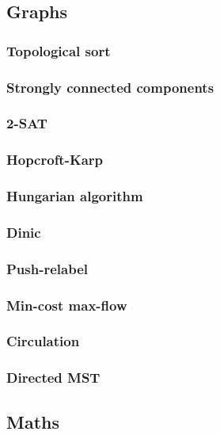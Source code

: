 \documentclass[landscape,a4paper,twocolumn,10pt]{report}
\begin{document}
\footnotesize

\subsection*{Graphs}
\subsubsection*{Topological sort}

\subsubsection*{Strongly connected components}

\subsubsection*{2-SAT}

\subsubsection*{Hopcroft-Karp}

\subsubsection*{Hungarian algorithm}

\subsubsection*{Dinic}

\subsubsection*{Push-relabel}

\subsubsection*{Min-cost max-flow}

\subsubsection*{Circulation}

\subsubsection*{Directed MST}


\newpage
\subsection*{Maths}
\end{document}
